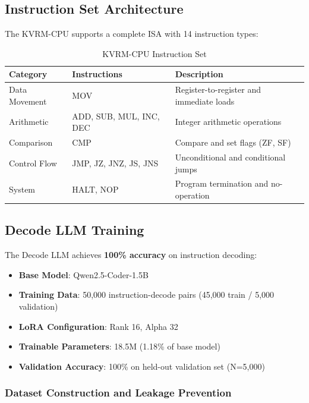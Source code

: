 \documentclass[11pt,a4paper]{article}
\begin{document}
\subsection{Instruction Set Architecture}

The KVRM-CPU supports a complete ISA with 14 instruction types:

\begin{table}[H]
\centering
\caption{KVRM-CPU Instruction Set}
\label{tab:isa}
\begin{tabular}{@{}llp{6cm}@{}}
\toprule
\textbf{Category} & \textbf{Instructions} & \textbf{Description} \\
\midrule
Data Movement & MOV & Register-to-register and immediate loads \\
Arithmetic & ADD, SUB, MUL, INC, DEC & Integer arithmetic operations \\
Comparison & CMP & Compare and set flags (ZF, SF) \\
Control Flow & JMP, JZ, JNZ, JS, JNS & Unconditional and conditional jumps \\
System & HALT, NOP & Program termination and no-operation \\
\bottomrule
\end{tabular}
\end{table}

\subsection{Decode LLM Training}

The Decode LLM achieves \textbf{100\% accuracy} on instruction decoding:

\begin{itemize}
    \item \textbf{Base Model}: Qwen2.5-Coder-1.5B \citep{qwen25coder_2024}
    \item \textbf{Training Data}: 50,000 instruction-decode pairs (45,000 train / 5,000 validation)
    \item \textbf{LoRA Configuration}: Rank 16, Alpha 32
    \item \textbf{Trainable Parameters}: 18.5M (1.18\% of base model)
    \item \textbf{Validation Accuracy}: 100\% on held-out validation set (N=5,000)
\end{itemize}

\subsubsection{Dataset Construction and Leakage Prevention}
\end{document}
